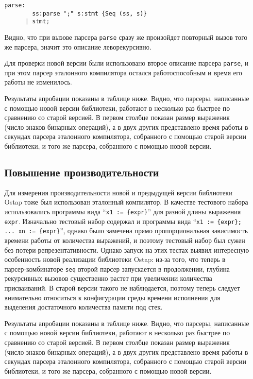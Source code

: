 \begin{lstlisting}[basicstyle=\small]
  parse:
        ss:parse ";" s:stmt {Seq (ss, s)}
      | stmt;
\end{lstlisting}

Видно, что при вызове парсера \lstinline|parse| сразу же произойдет повторный вызов того же парсера, значит это описание леворекурсивно.

Для проверки новой версии были использовано второе описание парсера \lstinline|parse|, и при этом  парсер эталонного компилятора остался работоспособным и время его работы не изменилось.

Результаты апробации показаны в таблице ниже. Видно, что парсеры, написанные с помощью новой версии библиотеки, работают в несколько раз быстрее по сравнению со старой версией. В первом столбце показан размер выражения (число знаков бинарных операций), а в двух других представлено время работы в секундах парсера эталонного компилятора, собранного с помощью старой версии библиотеки, и того же парсера, собранного с помощью новой версии.

\subsection{Повышение производительности}

Для измерения производительности новой и предыдущей версии библиотеки Ostap тоже был использован эталонный компилятор. В качестве тестового набора использовались программы вида ``\lstinline|x1 := {expr}|'' для разной длины выражения \lstinline|expr|. Изначально тестовый набор содержал и программы вида ``\lstinline|x1 := {expr}; ... xn := {expr}|'', однако было замечена прямо пропорциональная зависимость времени работы от количества выражений, и поэтому тестовый набор был сужен без потери репрезентативности. Однако запуск на этих тестах выявил интересную особенность новой реализации библиотеки Ostap: из-за того, что теперь в парсер-комбинаторе \lstinline|seq| второй парсер запускается в продолжении, глубина рекурсивных вызовов существенно растет при увеличении количества присваиваний. В старой версии такого не наблюдается, поэтому теперь следует внимательно относиться к конфигурации среды времени исполнения для выделения достаточного количества памяти под стек.

Результаты апробации показаны в таблице ниже. Видно, что парсеры, написанные с помощью новой версии библиотеки, работают в несколько раз быстрее по сравнению со старой версией. В первом столбце показан размер выражения (число знаков бинарных операций), а в двух других представлено время работы в секундах парсера эталонного компилятора, собранного с помощью старой версии библиотеки, и того же парсера, собранного с помощью новой версии.

